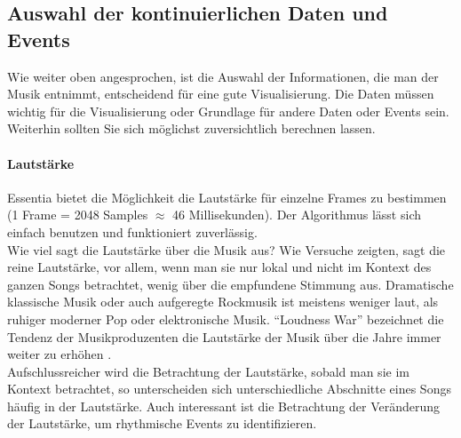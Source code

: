 \documentclass[11pt,a4paper]{article}
\begin{document}
\subsection{Auswahl der kontinuierlichen Daten und Events}
Wie weiter oben angesprochen, ist die Auswahl der Informationen, die man der Musik entnimmt, entscheidend für eine gute Visualisierung. Die Daten müssen wichtig für die Visualisierung oder Grundlage für andere Daten oder Events sein. Weiterhin sollten Sie sich möglichst zuversichtlich berechnen lassen.
\paragraph{Lautstärke}
Essentia bietet die Möglichkeit die Lautstärke für einzelne Frames  zu bestimmen (1 Frame = 2048 Samples $\approx$ 46 Millisekunden). Der Algorithmus lässt sich einfach benutzen und funktioniert zuverlässig.\\
Wie viel sagt die Lautstärke über die Musik aus? Wie Versuche zeigten, sagt die reine Lautstärke, vor allem, wenn man sie nur lokal und nicht im Kontext des ganzen Songs betrachtet, wenig über die empfundene Stimmung aus. Dramatische klassische Musik oder auch aufgeregte Rockmusik ist meistens weniger laut, als ruhiger moderner Pop oder elektronische Musik. ``Loudness War'' bezeichnet die Tendenz der Musikproduzenten die Lautstärke der Musik über die Jahre immer weiter zu erhöhen \cite{683ea11abc74c43c6680cd4c08dc538caee546575b59c2f40d70033cf3389ec8}.\\
Aufschlussreicher wird die Betrachtung der Lautstärke, sobald man sie im Kontext betrachtet, so unterscheiden sich unterschiedliche Abschnitte eines Songs häufig in der Lautstärke. Auch interessant ist die Betrachtung der Veränderung der Lautstärke, um rhythmische Events zu identifizieren.
\end{document}
